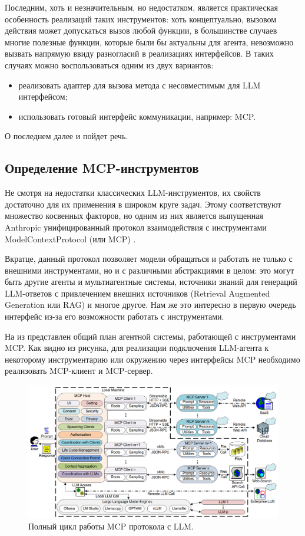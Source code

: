 Последним, хоть и незначительным, но недостатком, является практическая особенность 
реализаций таких инструментов: хоть концептуально, вызовом действия может допускаться
вызов любой функции, в большинстве случаев многие полезные функции, которые были бы 
актуальны для агента, невозможно вызвать напрямую ввиду разногласий в реализациях 
интерфейсов. В таких случаях можно воспользоваться одним из двух вариантов:
\begin{itemize}
    \item реализовать адаптер для вызова метода с несовместимым для LLM интерфейсом;
    \item использовать готовый интерфейс коммуникации, например: MCP. 
\end{itemize}
О последнем далее и пойдет речь.

\subsection{Определение MCP-инструментов} \label{ch2:sec1:subsec2}

Не смотря на недостатки классических LLM-инструментов, их свойств достаточно для их
применения в широком круге задач. Этому соответствуют множество косвенных факторов, но
одним из них является выпущенная Anthropic унифицированный протокол взаимодействия с 
инструментами ModelContextProtocol (или MCP) \cite{mcp-docs}.

Вкратце, данный протокол позволяет модели обращаться и работать не только с внешними 
инструментами, но и с различными абстракциями в целом: это могут быть другие агенты и 
мультиагентные системы, источники знаний для генераций LLM-ответов с привлечением внешних 
источников (Retrieval Augmented Generation или RAG) и многое другое. Нам же это интересно
в первую очередь интерфейс из-за его возможности работать с инструментами.

На  из \cite{mcp_survey}
представлен общий план агентной системы, работающей с инструментами MCP. Как видно из 
рисунка, для реализации подключения LLM-агента к некоторому инструментарию или
окружению через интерфейсы MCP необходимо реализовать MCP-клиент и MCP-сервер. 

\begin{figure}
    \center
	\includegraphics[scale=0.32]{sources/mcp_workflow.png}
	\caption{Полный цикл работы MCP протокола с LLM.} 
	\label{fig:ch2:mcp_survey}  
\end{figure}

